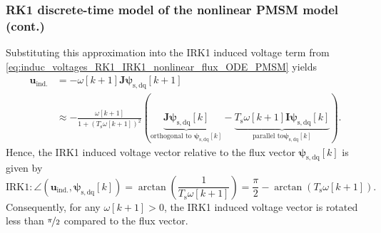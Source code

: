\begin{frame}
    \frametitle{RK1 discrete-time model of the nonlinear PMSM model (cont.)}
    Substituting this approximation into the IRK1 induced voltage term from \eqref{eq:induc_voltages_RK1_IRK1_nonlinear_flux_ODE_PMSM} yields
    \begin{equation*}
        \begin{split}
            \bm{u}_\mathrm{ind.} & = -\omega[k+1]\bm{J}\bm{\psi}_\mathrm{s,dq}[k+1] \\ &\approx -\frac{\omega[k+1]}{1+(T_\mathrm{s}\omega[k+1])^2}(\underbrace{\bm{J}\bm{\psi}_{\mathrm{s,dq}}[k]}_{\text{orthogonal to } \bm{\psi}_\mathrm{s,dq}[k]} - \underbrace{T_\mathrm{s}\omega[k+1]\bm{I}\bm{\psi}_\mathrm{s,dq}[k]}_{\text{parallel to} \bm{\psi}_\mathrm{s,dq}[k]} ).
        \end{split}
    \end{equation*}\pause
    Hence, the IRK1 induced voltage vector relative to the flux vector $\bm{\psi}_\mathrm{s,dq}[k]$ is given by
    \begin{equation*}
        \text{IRK1:} \, \angle\left(\bm{u}_\mathrm{ind.}, \bm{\psi}_\mathrm{s,dq}[k]\right) = \arctan\left(\frac{1}{T_\mathrm{s}\omega[k+1]}\right) = \frac{\pi}{2} - \arctan\left(T_\mathrm{s}\omega[k+1]\right).
    \end{equation*}\pause
    Consequently, for any $\omega[k+1]>0$, the IRK1 induced voltage vector is rotated less than $\nicefrac{\pi}{2}$ compared to the flux vector.
\end{frame}


